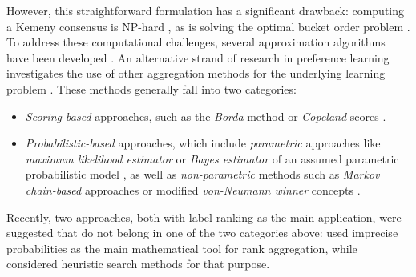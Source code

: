 However, this straightforward formulation has a significant drawback: computing a Kemeny consensus is NP-hard \parencite{bartholdi_computational_1989}, as is solving the optimal bucket order problem \parencite{lorena_biased_2021}.
%
To address these computational challenges, several approximation algorithms have been developed \parencite{aledo_utopia_2017, aledo_approaching_2019, aledo_highly_2021}.
%
An alternative strand of research in preference learning investigates the use of other aggregation methods for the underlying learning problem \parencite{bengs_preference-based_2021, hullermeier_preference_2024}.
%
These methods generally fall into two categories:
%
\begin{itemize}

    \item \textit{Scoring-based} approaches, such as the \textit{Borda} method \parencite{black_partial_1976} or \textit{Copeland} scores \parencite{copeland_reasonable_1951}.

    \item \textit{Probabilistic-based} approaches, which include \textit{parametric} approaches like \textit{maximum likelihood estimator} or \textit{Bayes estimator} of an assumed parametric probabilistic model \parencite{cheng_label_2010}, as well as \textit{non-parametric} methods such as \textit{Markov chain-based} approaches \parencite{dwork_rank_2001} or modified \textit{von-Neumann winner} concepts \parencite{dudik_contextual_2015}.
%
\end{itemize}
%
%
Recently, two approaches, both with label ranking as the main application, were suggested that do not belong in one of the two categories above: \textcite{adam_inferring_2024} used imprecise probabilities as the main mathematical tool for rank aggregation, while \textcite{zhou_heuristic_2024} considered heuristic search methods for that purpose.

